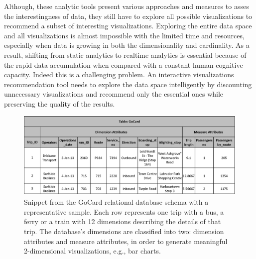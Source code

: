 Although, these analytic tools present various approaches and measures to asses the interestingness of data, they still have to explore all possible visualizations to recommend a subset of interesting visualizations.
%
Exploring the entire data space and all visualizations is almost impossible with the limited time and resources, especially when data is growing in both the dimensionality and cardinality.
% 
As a result, shifting from static analytics to realtime analytics is essential because of the rapid data accumulation when compared with a constant human cognitive capacity. 
%
Indeed this is a challenging problem.
%
An interactive visualizations recommendation tool needs to explore the data space intelligently by discounting unnecessary visualizations and recommend only the essential ones while preserving the quality of the results.
%
%
%
\begin{figure}[t]
  \centering
    \includegraphics[width=\textwidth]{gocard_schemaandsample.png}
    \caption{Snippet from the GoCard relational database schema with a representative sample. Each row represents one trip with a bus, a ferry or a train with 12 dimensions describing the details of that trip. 
		The database's dimensions are classified into two: dimension attributes and measure attributes, in order to generate meaningful 2-dimensional visualizations, e.g., bar charts.
		}
    \label{fig:gocard_schemaandsample}
\end{figure}
%
%
%
%

